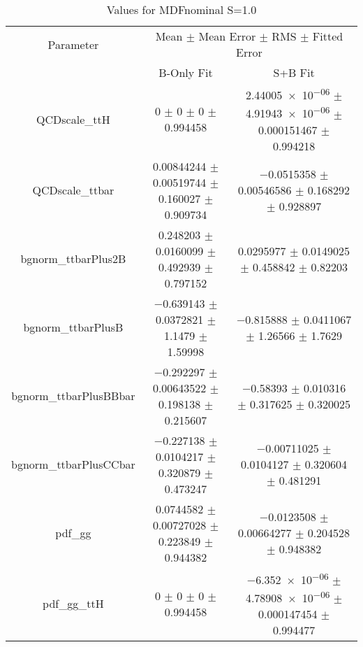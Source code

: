 \begin{table}
\centering
\caption{Values for MDFnominal S=1.0}
\begin{tabular}{ccc}
\toprule
Parameter & \multicolumn{2}{c}{Mean $\pm$ Mean Error $\pm$ RMS $\pm$ Fitted Error}\\
 & B-Only Fit & S+B Fit\\
\midrule
QCDscale\_ttH & \num{0} $\pm$ \num{0} $\pm$ \num{0} $\pm$ \num{0.994458} & \num{2.44005e-06} $\pm$ \num{4.91943e-06} $\pm$ \num{0.000151467} $\pm$ \num{0.994218}\\
QCDscale\_ttbar & \num{0.00844244} $\pm$ \num{0.00519744} $\pm$ \num{0.160027} $\pm$ \num{0.909734} & \num{-0.0515358} $\pm$ \num{0.00546586} $\pm$ \num{0.168292} $\pm$ \num{0.928897}\\
bgnorm\_ttbarPlus2B & \num{0.248203} $\pm$ \num{0.0160099} $\pm$ \num{0.492939} $\pm$ \num{0.797152} & \num{0.0295977} $\pm$ \num{0.0149025} $\pm$ \num{0.458842} $\pm$ \num{0.82203}\\
bgnorm\_ttbarPlusB & \num{-0.639143} $\pm$ \num{0.0372821} $\pm$ \num{1.1479} $\pm$ \num{1.59998} & \num{-0.815888} $\pm$ \num{0.0411067} $\pm$ \num{1.26566} $\pm$ \num{1.7629}\\
bgnorm\_ttbarPlusBBbar & \num{-0.292297} $\pm$ \num{0.00643522} $\pm$ \num{0.198138} $\pm$ \num{0.215607} & \num{-0.58393} $\pm$ \num{0.010316} $\pm$ \num{0.317625} $\pm$ \num{0.320025}\\
bgnorm\_ttbarPlusCCbar & \num{-0.227138} $\pm$ \num{0.0104217} $\pm$ \num{0.320879} $\pm$ \num{0.473247} & \num{-0.00711025} $\pm$ \num{0.0104127} $\pm$ \num{0.320604} $\pm$ \num{0.481291}\\
pdf\_gg & \num{0.0744582} $\pm$ \num{0.00727028} $\pm$ \num{0.223849} $\pm$ \num{0.944382} & \num{-0.0123508} $\pm$ \num{0.00664277} $\pm$ \num{0.204528} $\pm$ \num{0.948382}\\
pdf\_gg\_ttH & \num{0} $\pm$ \num{0} $\pm$ \num{0} $\pm$ \num{0.994458} & \num{-6.352e-06} $\pm$ \num{4.78908e-06} $\pm$ \num{0.000147454} $\pm$ \num{0.994477}\\
\bottomrule
\end{tabular}
\end{table}